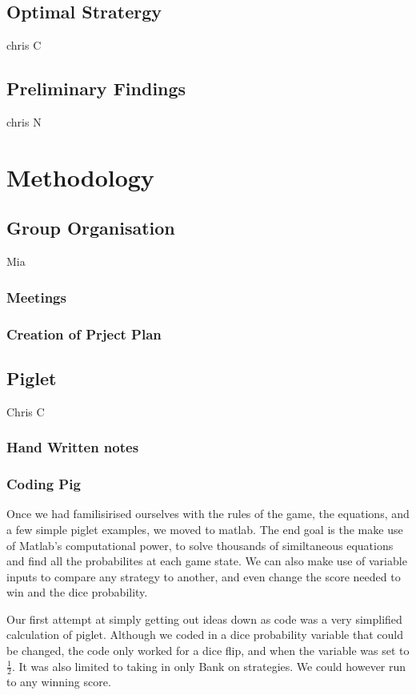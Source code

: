 \documentclass[a4paper,titlepage]{article}
\begin{document}
\subsection{Optimal Stratergy}
chris C
\subsection{Preliminary Findings}
chris N


\section{Methodology}
\subsection{Group Organisation}
Mia
\subsubsection{Meetings}
\subsubsection{Creation of Prject Plan}

\subsection{Piglet}
Chris C
\subsubsection{Hand Written notes}
\subsubsection{Coding Pig}


Once we had familisirised ourselves with the rules of the game, the equations, and
a few simple piglet examples, we moved to matlab.
The end goal is the make use of Matlab's computational power, to solve thousands of
similtaneous equations and find all the probabilites at each game state.
We can also make use of variable inputs to compare any strategy to another, and
even change the score needed to win and the dice probability.

Our first attempt at simply getting out ideas down as code was a very simplified
calculation of piglet. Although we coded in a dice probability variable that could be changed,
the code only worked for a dice flip, and when the variable was set to $\frac{1}{2}$.
It was also limited to taking in only Bank on strategies.
We could however run to any winning score.
\end{document}
